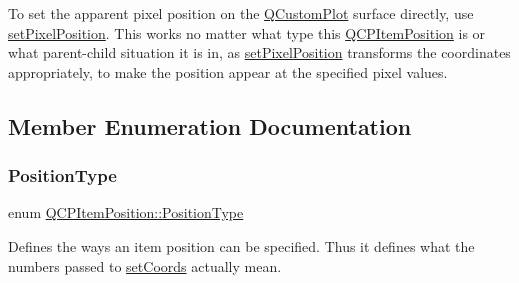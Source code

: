 To set the apparent pixel position on the \hyperlink{class_q_custom_plot}{Q\+Custom\+Plot} surface directly, use \hyperlink{class_q_c_p_item_position_a8d4f858f2089973967cf9cb81970ef0a}{set\+Pixel\+Position}. This works no matter what type this \hyperlink{class_q_c_p_item_position}{Q\+C\+P\+Item\+Position} is or what parent-\/child situation it is in, as \hyperlink{class_q_c_p_item_position_a8d4f858f2089973967cf9cb81970ef0a}{set\+Pixel\+Position} transforms the coordinates appropriately, to make the position appear at the specified pixel values. 

\subsection{Member Enumeration Documentation}
\mbox{\label{class_q_c_p_item_position_aad9936c22bf43e3d358552f6e86dbdc8}} 
\subsubsection{\texorpdfstring{Position\+Type}{PositionType}}
{\footnotesize\ttfamily enum \hyperlink{class_q_c_p_item_position_aad9936c22bf43e3d358552f6e86dbdc8}{Q\+C\+P\+Item\+Position\+::\+Position\+Type}}

Defines the ways an item position can be specified. Thus it defines what the numbers passed to \hyperlink{class_q_c_p_item_position_aa988ba4e87ab684c9021017dcaba945f}{set\+Coords} actually mean.

